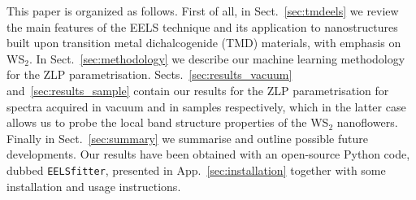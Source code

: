 This paper is organized as follows.
%
First of all, in Sect.~\ref{sec:tmdeels}
we review the main features of the EELS technique
and its application to nanostructures built upon transition metal
dichalcogenide (TMD) materials, with emphasis on WS$_2$.
%
In Sect.~\ref{sec:methodology} we describe our machine learning methodology
for the ZLP parametrisation.
%
Sects.~\ref{sec:results_vacuum} and~\ref{sec:results_sample} contain
our results for the ZLP parametrisation for spectra acquired
in vacuum and in samples respectively, which in the latter
case allows us to probe the local band structure properties
of the WS$_2$ nanoflowers.
%
Finally in Sect.~\ref{sec:summary} we summarise
and outline possible future developments.
%
Our results have been obtained with an open-source {\sc Python} code,
dubbed {\tt EELSfitter}, presented in App.~\ref{sec:installation}
together with some installation and usage instructions.
